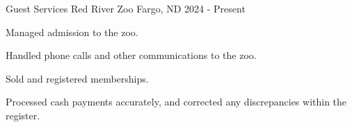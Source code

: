 

\begin{cventries}

\cventry
  {Guest Services} %
  {Red River Zoo} %
  {Fargo, ND} %
  {2024 - Present} %
  {
    \begin{cvitems} %
      \item {Managed admission to the zoo.}
      \item {Handled phone calls and other communications to the zoo.}
      \item {Sold and registered memberships.}
      \item {Processed cash payments accurately, and corrected any discrepancies within the register.}
    \end{cvitems}
  }

\end{cventries}
